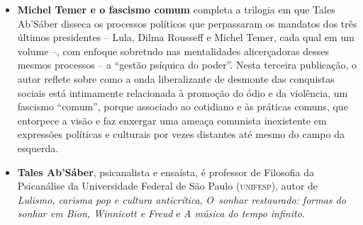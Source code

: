 \begin{itemize}


\item \textbf{Michel Temer e o fascismo comum} completa a trilogia em que Tales Ab'Sáber disseca
os processos políticos que perpassaram os mandatos dos três últimos presidentes -- Lula, Dilma
Rousseff e Michel Temer, cada qual em um volume --, com enfoque sobretudo nas mentalidades
alicerçadoras desses mesmos processos -- a ``gestão psíquica do poder''.
Nesta terceira publicação, o autor reflete sobre como a onda liberalizante de desmonte das
conquistas sociais está intimamente relacionada à promoção do ódio e da violência, um fascismo
``comum'', porque associado ao cotidiano e às práticas comuns, que entorpece a visão
e faz enxergar uma ameaça comunista inexistente em expressões políticas e culturais
por vezes distantes até mesmo do campo da esquerda.
  
\item \textbf{Tales Ab’Sáber}, psicanalista e ensaísta, é professor de Filosofia da Psicanálise da Universidade Federal 
de São Paulo (\textsc{unifesp}), autor de 
\emph{Lulismo, carisma pop e cultura anticrítica},
\textit{O~sonhar
restaurado: formas do sonhar em Bion, Winnicott e Freud} e
\textit{A música do tempo infinito}. 

\end{itemize}

